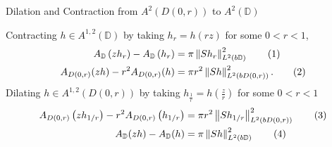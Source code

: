 \documentclass{reu_beamer}
\begin{document}
\begin{frame}{Dilation and Contraction from $A^2(D(0,r))$ to $A^2(\mathbb{D})$}

    Contracting $h\in A^{1, 2}(\mathbb{D})$ by taking $h_r = h(rz)$ for some \(0 < r < 1\),
    \begin{align*}
        A_{\mathbb{D}}\left(zh_{r}\right) - A_{\mathbb{D}}\left(h_{r}\right) &= \pi \left\Vert Sh_{r} \right\Vert_{L^2(b\mathbb{D})}^2\tag{1}\\
        A_{D(0,r)}(zh) - r^2 A_{D(0,r)}(h) &= \pi r^2 \left\Vert Sh \right\Vert_{L^{2}(bD(0,r))}^2.\tag{2}
    \end{align*}
    Dilating $h \in A^{1,2}(D(0,r))$ by taking $h_{\frac{1}{r}}=h(\frac{z}{r})$ for some $0 < r < 1$
    \begin{align*}
        A_{D(0,r)}\left(zh_{1/r}\right) - r^2A_{D(0,r)}\left(h_{1/r}\right) &= \pi r^2 \left\Vert Sh_{1/r} \right\Vert_{L^{2}(bD(0,r))}^2\tag{3}\\
        A_{\mathbb{D}}(zh) - A_{\mathbb{D}}(h) &= \pi \left\Vert Sh \right\Vert_{L^{2}(b\mathbb{D})}^2\tag{4}
    \end{align*}
\end{frame}
\end{document}
